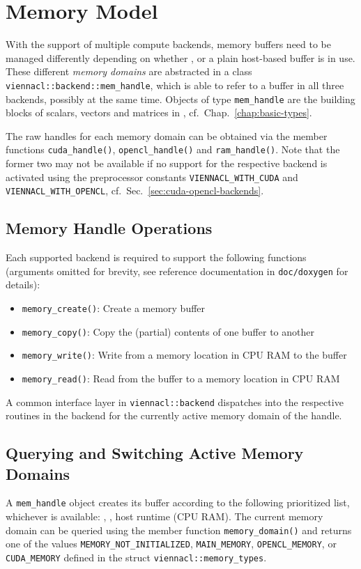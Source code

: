 \chapter{Memory Model}
With the support of multiple compute backends, memory buffers need to be managed differently depending on whether {\CUDA}, {\OpenCL} or a plain host-based buffer is in use.
These different \emph{memory domains} are abstracted in a class \lstinline|viennacl::backend::mem_handle|,
which is able to refer to a buffer in all three backends, possibly at the same time. Objects of type \lstinline|mem_handle| are the building blocks of scalars, vectors and matrices in {\ViennaCL}, cf.~Chap.~\ref{chap:basic-types}.


The raw handles for each memory domain can be obtained via the member functions
\lstinline|cuda_handle()|, \lstinline|opencl_handle()| and \lstinline|ram_handle()|. 
Note that the former two may not be available if no support for the respective backend is activated using the preprocessor constants \lstinline|VIENNACL_WITH_CUDA| and \lstinline|VIENNACL_WITH_OPENCL|, cf.~Sec.~\ref{sec:cuda-opencl-backends}.

\section{Memory Handle Operations}
Each supported backend is required to support the following functions (arguments omitted for brevity, see reference documentation in \lstinline|doc/doxygen| for details):
\begin{itemize}
 \item \lstinline|memory_create()|: Create a memory buffer
 \item \lstinline|memory_copy()|: Copy the (partial) contents of one buffer to another
 \item \lstinline|memory_write()|: Write from a memory location in CPU RAM to the buffer
 \item \lstinline|memory_read()|: Read from the buffer to a memory location in CPU RAM
\end{itemize}
A common interface layer in \lstinline|viennacl::backend| dispatches into the respective routines in the backend for the currently active memory domain of the handle.


\section{Querying and Switching Active Memory Domains}
A \lstinline|mem_handle| object creates its buffer according to the following prioritized list, whichever is available: {\CUDA}, {\OpenCL}, host runtime (CPU RAM).
The current memory domain can be queried using the member function \lstinline|memory_domain()| and returns one of the values \lstinline|MEMORY_NOT_INITIALIZED|, \lstinline|MAIN_MEMORY|, \lstinline|OPENCL_MEMORY|, or \lstinline|CUDA_MEMORY|
defined in the struct \lstinline|viennacl::memory_types|.


